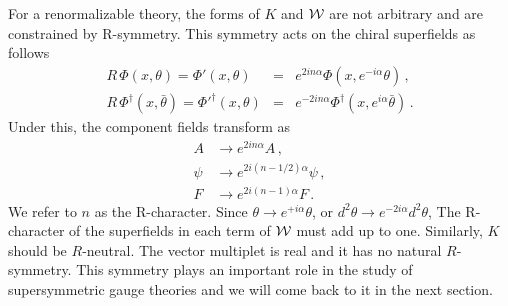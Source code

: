 For a renormalizable theory, the forms of $K$ and ${\cal W}$ are not
arbitrary and are constrained by R-symmetry. This symmetry acts on the
chiral superfields as follows
\begin{eqnarray}
R\,\Phi (x,\theta) = \Phi'(x,\theta) &=& e^{2 in\alpha}
\Phi (x, e^{-i\alpha}\theta)\,, \nonumber \\
R\,\Phi^\dagger(x,\bar\theta ) = \Phi'^\dagger(x,\theta) &=& e^{-2
in\alpha}\Phi^\dagger(x, e^{i \alpha}\bar{\theta})\,. \nonumber
\end{eqnarray}
Under this, the component fields transform as 
$$
\begin{array}{lll}
A & \rightarrow e^{2i n \alpha} A \,,\\
\psi & \rightarrow e^{2i(n-1/2) \alpha} \psi\,, \\
F & \rightarrow e^{2i(n-1) \alpha} F\,.
\end{array}
$$
We refer to $n$ as the R-character. Since $\theta \rightarrow
e^{+i\alpha}\theta$, or $d^2\theta \rightarrow e^{-2 i\alpha}d^2
\theta$, The R-character of the superfields in each term of ${\cal W}$
must add up to one. Similarly, $K$ should be $R$-neutral. The vector
multiplet is real and it has no natural $R$-symmetry. This symmetry
plays an important role in the study of supersymmetric gauge theories
and we will come back to it in the next section.

